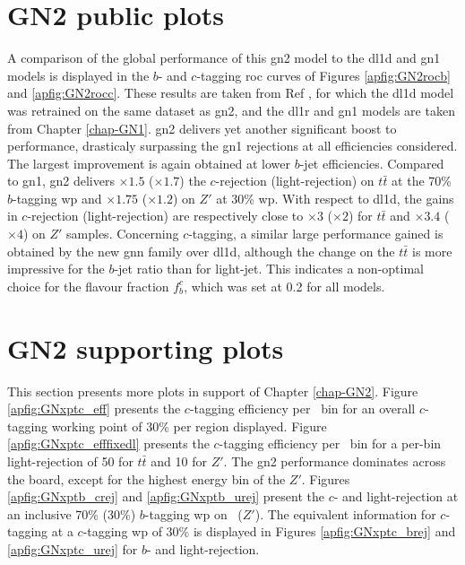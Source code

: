\newpage

\section{GN2 public plots}
A comparison of the global performance of this \gls{gn2} model to the \gls{dl1d} and \gls{gn1} models is displayed in the $b$- and $c$-tagging \gls{roc} curves of Figures \ref{apfig:GN2rocb} and \ref{apfig:GN2rocc}. These results are taken from Ref \cite{ATL-PLOT-FTAG-2023-01}, for which the \gls{dl1d} model was retrained on the same dataset as \gls{gn2}, and the \gls{dl1r} and \gls{gn1} models are taken from Chapter \ref{chap-GN1}. \gls{gn2} delivers yet another significant boost to performance, drasticaly surpassing the \gls{gn1} rejections at all efficiencies considered. The largest improvement is again obtained at lower $b$-jet efficiencies. Compared to \gls{gn1}, \gls{gn2} delivers $\times 1.5$ ($\times 1.7$) the $c$-rejection (light-rejection) on $t\bar{t}$ at the 70\% $b$-tagging \gls{wp} and $\times 1.75$ ($\times 1.2$) on $Z'$ at 30\% \gls{wp}. With respect to \gls{dl1d}, the gains in $c$-rejection (light-rejection) are respectively close to $\times 3$ ($\times 2$) for $t\bar{t}$ and $\times 3.4$ ($\times 4$) on $Z'$ samples. Concerning $c$-tagging, a similar large performance gained is obtained by the new \gls{gnn} family over \gls{dl1d}, although the change on the $t\bar{t}$ is more impressive for the $b$-jet ratio than for light-jet. This indicates a non-optimal choice for the flavour fraction $f^c_b$, which was set at 0.2 for all models.

\section{GN2 supporting plots}\label{app-GN2sup}
This section presents more plots in support of Chapter \ref{chap-GN2}. Figure \ref{apfig:GNxptc_eff} presents the $c$-tagging efficiency per \pt\ bin for an overall $c$-tagging working point of 30\% per region displayed. Figure \ref{apfig:GNxptc_efffixedl} presents the $c$-tagging efficiency per \pt\ bin for a per-bin light-rejection of 50 for $t\bar{t}$ and 10 for $Z'$. The \gls{gn2} performance dominates across the board, except for the highest energy bin of the $Z'$. Figures \ref{apfig:GNxptb_crej} and \ref{apfig:GNxptb_urej} present the $c$- and light-rejection at an inclusive 70\% (30\%) $b$-tagging \gls{wp} on \ttb\ ($Z'$). The equivalent information for $c$-tagging at a $c$-tagging \gls{wp} of 30\% is displayed in Figures \ref{apfig:GNxptc_brej} and \ref{apfig:GNxptc_urej} for $b$- and light-rejection. 


